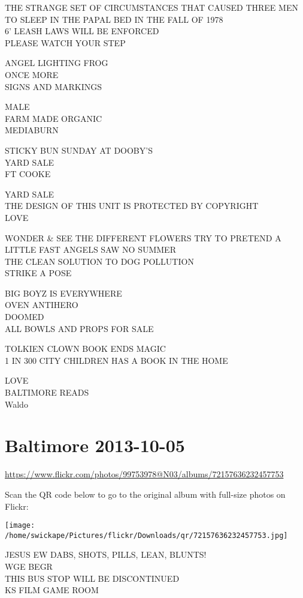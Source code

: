 \documentclass[10pt,letterpaper]{article}
\begin{document}
THE STRANGE SET OF CIRCUMSTANCES THAT CAUSED THREE MEN TO SLEEP IN THE PAPAL BED IN THE FALL OF 1978\\
6' LEASH LAWS WILL BE ENFORCED\\
PLEASE WATCH YOUR STEP

ANGEL LIGHTING FROG\\
ONCE MORE\\
SIGNS AND MARKINGS

MALE\\
FARM MADE ORGANIC\\
MEDIABURN

STICKY BUN SUNDAY AT DOOBY'S\\
YARD SALE\\
FT COOKE

YARD SALE\\
THE DESIGN OF THIS UNIT IS PROTECTED BY COPYRIGHT\\
LOVE

WONDER \& SEE THE DIFFERENT FLOWERS TRY TO PRETEND A LITTLE FAST ANGELS SAW NO SUMMER\\
THE CLEAN SOLUTION TO DOG POLLUTION\\
STRIKE A POSE

BIG BOYZ IS EVERYWHERE\\
OVEN ANTIHERO\\
DOOMED\\
ALL BOWLS AND PROPS FOR SALE

TOLKIEN CLOWN BOOK ENDS MAGIC\\
1 IN 300 CITY CHILDREN HAS A BOOK IN THE HOME

LOVE\\
BALTIMORE READS\\
Waldo
\pagebreak

\section*{Baltimore 2013-10-05}

\url{https://www.flickr.com/photos/99753978@N03/albums/72157636232457753}

Scan the QR code below to go to the original album with full-size photos on Flickr:

\texttt{[image: /home/swickape/Pictures/flickr/Downloads/qr/72157636232457753.jpg]}
\pagebreak

JESUS EW DABS, SHOTS, PILLS, LEAN, BLUNTS!\\
WGE BEGR\\
THIS BUS STOP WILL BE DISCONTINUED\\
KS FILM GAME ROOM
\end{document}
